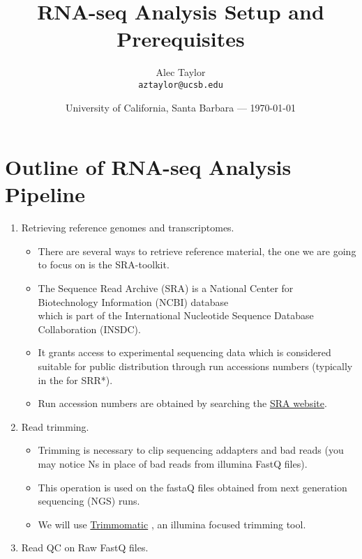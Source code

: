 \documentclass{article}
\title{\LARGE RNA-seq Analysis Setup and Prerequisites} %
\author{\Large Alec Taylor\\ \normalsize \texttt{aztaylor@ucsb.edu}} %
\date{University of California, Santa Barbara --- \today} %
\begin{document}
\maketitle %

\setlength{\parindent}{24pt}
\singlespacing
\tableofcontents
\singlespacing

\section{Outline of RNA-seq Analysis Pipeline}
\begin{enumerate}
	\setlength\itemsep{-0.5em}
	\item Retrieving reference genomes and transcriptomes.
	\begin{itemize}
		\item There are several ways to retrieve reference material, the one we are going to focus on is the SRA-toolkit.
		\item The Sequence Read Archive (SRA) is a National Center for Biotechnology Information (NCBI) database\\ which is part of the International Nucleotide Sequence Database Collaboration (INSDC).
		\item It grants access to experimental sequencing data which is considered suitable for public distribution through run accessions numbers (typically in the for SRR*).
		\item Run accession numbers are obtained by searching the \href{https://www.ncbi.nlm.nih.gov/sra}{SRA website}. 
	\end{itemize}
	\item Read trimming.
	\begin{itemize}
		\item Trimming is necessary to clip sequencing addapters and bad reads (you may notice Ns in place of bad reads from illumina FastQ files).
		\item This operation is used on the fastaQ files obtained from next generation sequencing (NGS) runs.
		\item We will use \href{http://www.usadellab.org/cms/?page=trimmomatic}{Trimmomatic} \cite{Bolger:2014aa}, an illumina focused trimming tool.
	\end{itemize}
	\item Read QC on Raw FastQ files.
	\begin{itemize}

\end{itemize}
\end{enumerate}
\end{document}

